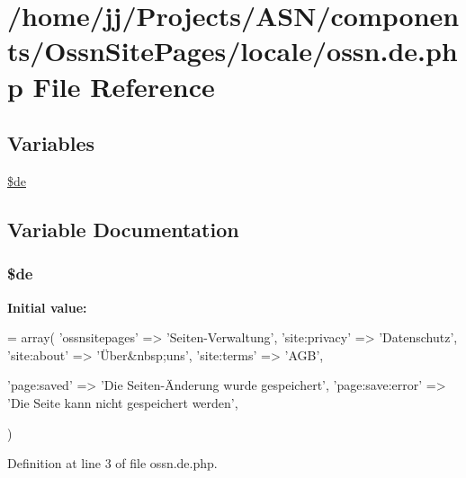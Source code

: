 \hypertarget{components_2_ossn_site_pages_2locale_2ossn_8de_8php}{}\section{/home/jj/\+Projects/\+A\+S\+N/components/\+Ossn\+Site\+Pages/locale/ossn.de.\+php File Reference}
\label{components_2_ossn_site_pages_2locale_2ossn_8de_8php}
\subsection*{Variables}
\begin{DoxyCompactItemize}
\item 
\hyperlink{components_2_ossn_site_pages_2locale_2ossn_8de_8php_aab7de7e51b4580005f63dd4cf5e17311}{\$de}
\end{DoxyCompactItemize}


\subsection{Variable Documentation}
\subsubsection[{\texorpdfstring{\$de}{$de}}]{\setlength{\rightskip}{0pt plus 5cm}\$de}\hypertarget{components_2_ossn_site_pages_2locale_2ossn_8de_8php_aab7de7e51b4580005f63dd4cf5e17311}{}\label{components_2_ossn_site_pages_2locale_2ossn_8de_8php_aab7de7e51b4580005f63dd4cf5e17311}
{\bfseries Initial value\+:}
\begin{DoxyCode}
= array(
    \textcolor{stringliteral}{'ossnsitepages'} => \textcolor{stringliteral}{'Seiten-Verwaltung'},
    \textcolor{stringliteral}{'site:privacy'} => \textcolor{stringliteral}{'Datenschutz'},
    \textcolor{stringliteral}{'site:about'} => \textcolor{stringliteral}{'Über&nbsp;uns'},
    \textcolor{stringliteral}{'site:terms'} => \textcolor{stringliteral}{'AGB'},

    \textcolor{stringliteral}{'page:saved'} => \textcolor{stringliteral}{'Die Seiten-Änderung wurde gespeichert'},
    \textcolor{stringliteral}{'page:save:error'} => \textcolor{stringliteral}{'Die Seite kann nicht gespeichert werden'},

)
\end{DoxyCode}


Definition at line 3 of file ossn.\+de.\+php.

